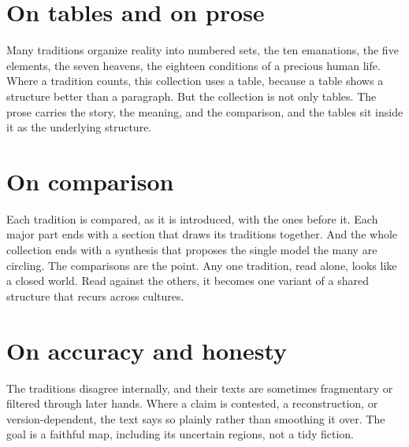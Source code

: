\section*{On tables and on prose}

Many traditions organize reality into numbered sets, the ten emanations, the five elements, the seven heavens,
the eighteen conditions of a precious human life. Where a tradition counts, this collection uses a table,
because a table shows a structure better than a paragraph. But the collection is not only tables. The prose
carries the story, the meaning, and the comparison, and the tables sit inside it as the underlying structure.

\section*{On comparison}

Each tradition is compared, as it is introduced, with the ones before it. Each major part ends with a section
that draws its traditions together. And the whole collection ends with a synthesis that proposes the single
model the many are circling. The comparisons are the point. Any one tradition, read alone, looks like a closed
world. Read against the others, it becomes one variant of a shared structure that recurs across cultures.

\section*{On accuracy and honesty}

The traditions disagree internally, and their texts are sometimes fragmentary or filtered through later hands.
Where a claim is contested, a reconstruction, or version-dependent, the text says so plainly rather than
smoothing it over. The goal is a faithful map, including its uncertain regions, not a tidy fiction.
